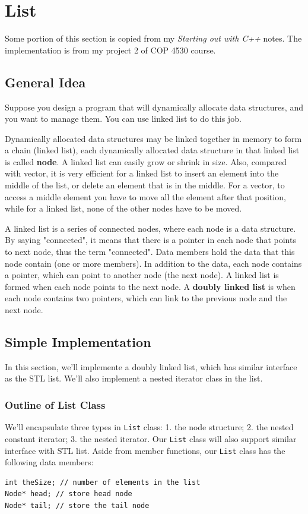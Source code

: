 \documentclass[12pt]{book}
\begin{document}
\chapter{List}
\label{sec:orgfaa9105}
Some portion of this section is copied from my \emph{Starting out with C++} notes. The implementation is from my project 2 of COP 4530 course.
\section{General Idea}
\label{sec:org0ffd31e}
Suppose you design a program that will dynamically allocate data structures, and you want to manage them. You can use linked list to do this job.

Dynamically allocated data structures may be linked together in memory to form a chain (linked list), each dynamically allocated data structure in that linked list is called \textbf{node}. A linked list can easily grow or shrink in size. Also, compared with vector, it is very efficient for a linked list to insert an element into the middle of the list, or delete an element that is in the middle. For a vector, to access a middle element you have to move all the element after that position, while for a linked list, none of the other nodes have to be moved.

A linked list is a series of connected nodes, where each node is a data structure. By saying "connected", it means that there is a pointer in each node that points to next node, thus the term "connected". Data members hold the data that this node contain (one or more members). In addition to the data, each node contains a pointer, which can point to another node (the next node). A linked list is formed when each node points to the next node. A \textbf{doubly linked list} is when each node contains two pointers, which can link to the previous node and the next node.
\section{Simple Implementation}
\label{sec:org6ce33c8}
In this section, we'll implemente a doubly linked list, which has similar interface as the STL list. We'll also implement a nested iterator class in the list.
\subsection{Outline of List Class}
\label{sec:orgf5aa46f}
We'll encapsulate three types in \texttt{List} class: 1. the node structure; 2. the nested constant iterator; 3. the nested iterator. Our \texttt{List} class will also support similar interface with STL list. Aside from member functions, our \texttt{List} class has the following data members:
\begin{verbatim}
int theSize; // number of elements in the list
Node* head; // store head node
Node* tail; // store the tail node
\end{verbatim}
\end{document}
